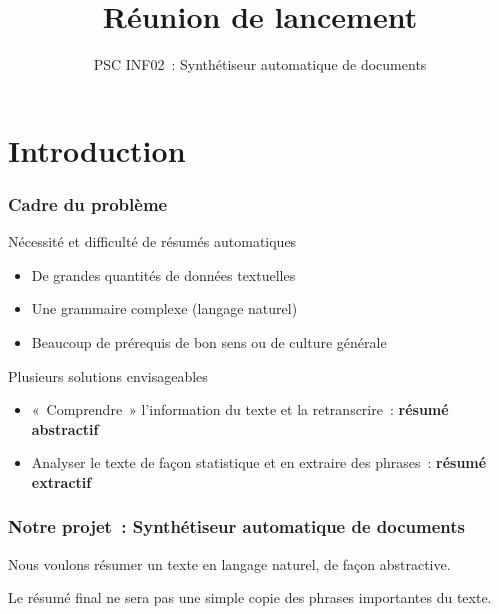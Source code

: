 \documentclass{beamer}
\title{Réunion de lancement}
\subtitle{PSC INF02~: Synthétiseur automatique de documents}
\author{}
\institute{École polytechnique}
\date{}
\begin{document}
\begin{frame}
  \titlepage{}
\end{frame}




\section{Introduction}

    \begin{frame}%
    \frametitle{Cadre du problème}%

        \begin{block}{Nécessité et difficulté de résumés automatiques}
            \begin{itemize}
                \item De grandes quantités de données textuelles
                \item Une grammaire complexe (langage naturel)
                \item Beaucoup de prérequis de bon sens ou de culture générale %
            \end{itemize}
        \end{block}


        \begin{block}{Plusieurs solutions envisageables}
            \begin{itemize}
                \item «~Comprendre~» l'information du texte et la retranscrire~: \textbf{résumé abstractif}
                \item Analyser le texte de façon statistique et en extraire des phrases~: \textbf{résumé extractif} %
            \end{itemize}
        \end{block}
    \end{frame}


    \begin{frame}
    \frametitle{Notre projet~: Synthétiseur automatique de documents}
        Nous voulons résumer un texte en langage naturel, de façon abstractive.

        Le résumé final ne sera pas une simple copie des phrases importantes du texte.
    \end{frame}
\end{document}
